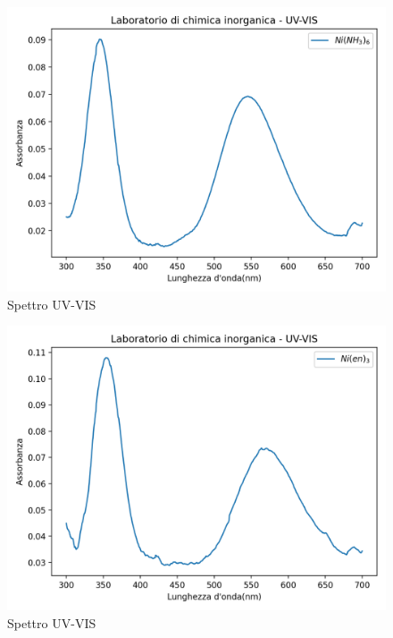 \begin{figure}[ht!]
    \centering
    \includegraphics{Relazione/foto/ninh3uv.png}
    
    \caption{Spettro UV-VIS }
    \label{fig:ninh3uv}
\end{figure}
\begin{figure}[ht!]
    \centering
   \includegraphics{Relazione/foto/Nienuv.png}
    \caption{Spettro UV-VIS }
    \label{fig:nienuv}
\end{figure}

